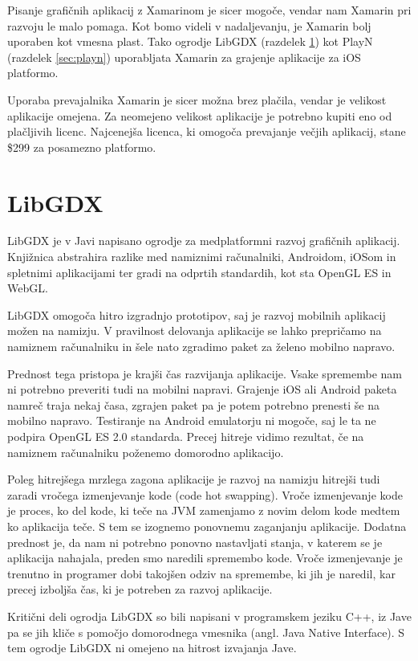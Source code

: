 Pisanje grafičnih aplikacij z Xamarinom je sicer mogoče, vendar nam Xamarin pri razvoju le malo pomaga. Kot bomo videli v nadaljevanju, je Xamarin bolj uporaben kot vmesna plast. Tako ogrodje LibGDX (razdelek \ref{sec:libgdx}) kot PlayN (razdelek \ref{sec:playn}) uporabljata Xamarin za grajenje aplikacije za iOS platformo.

Uporaba prevajalnika Xamarin je sicer možna brez plačila, vendar je velikost aplikacije omejena. Za neomejeno velikost aplikacije je potrebno kupiti eno od plačljivih licenc. Najcenejša licenca, ki omogoča prevajanje večjih aplikacij, stane \$299 za posamezno platformo.

\section{LibGDX}
\label{sec:libgdx}
LibGDX \cite{libgdx} je v Javi napisano ogrodje za medplatformni razvoj grafičnih aplikacij. Knjižnica abstrahira razlike med namiznimi računalniki, Androidom, iOSom in spletnimi aplikacijami ter gradi na odprtih standardih, kot sta OpenGL ES in WebGL.

LibGDX omogoča hitro izgradnjo prototipov, saj je razvoj mobilnih aplikacij možen na namizju. V pravilnost delovanja aplikacije se lahko prepričamo na namiznem računalniku in šele nato zgradimo paket za želeno mobilno napravo. 

Prednost tega pristopa je krajši čas razvijanja aplikacije. Vsake spremembe nam ni potrebno preveriti tudi na mobilni napravi. Grajenje iOS ali Android paketa namreč traja nekaj časa, zgrajen paket pa je potem potrebno prenesti še na mobilno napravo. Testiranje na Android emulatorju ni mogoče, saj le ta ne podpira OpenGL ES 2.0 standarda. Precej hitreje vidimo rezultat, če na namiznem računalniku poženemo domorodno aplikacijo.

Poleg hitrejšega mrzlega zagona aplikacije je razvoj na namizju hitrejši tudi zaradi vročega izmenjevanje kode (code hot swapping). Vroče izmenjevanje kode je proces, ko del kode, ki teče na JVM zamenjamo z novim delom kode medtem ko aplikacija teče. S tem se izognemo ponovnemu zaganjanju aplikacije. Dodatna prednost je, da nam ni potrebno ponovno nastavljati stanja, v katerem se je aplikacija nahajala, preden smo naredili spremembo kode. Vroče izmenjevanje je trenutno in programer dobi takojšen odziv na spremembe, ki jih je naredil, kar precej izboljša čas, ki je potreben za razvoj aplikacije.

Kritični deli ogrodja LibGDX so bili napisani v programskem jeziku C++, iz Jave pa se jih kliče s pomočjo domorodnega vmesnika (angl. Java Native Interface). S tem ogrodje LibGDX ni omejeno na hitrost izvajanja Jave.

